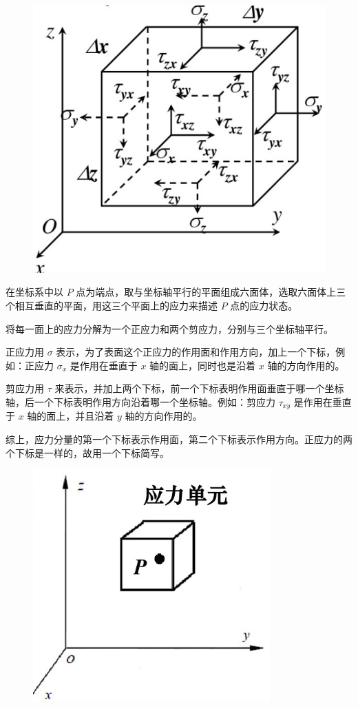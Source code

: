 \documentclass[12pt,a4paper]{article}
\begin{document}
\begin{figure}[H]
\centering
\includegraphics[scale=0.5]{./figures/17.png}
\caption{}
\end{figure}

在坐标系中以 $P$ 点为端点，取与坐标轴平行的平面组成六面体，选取六面体上三个相互垂直的平面，用这三个平面上的应力来描述 $P$ 点的应力状态。

将每一面上的应力分解为一个正应力和两个剪应力，分别与三个坐标轴平行。

正应力用 $\sigma$ 表示，为了表面这个正应力的作用面和作用方向，加上一个下标，例如：正应力 $\sigma_x$ 是作用在垂直于 $x$ 轴的面上，同时也是沿着 $x$ 轴的方向作用的。

剪应力用 $\tau$ 来表示，并加上两个下标，前一个下标表明作用面垂直于哪一个坐标轴，后一个下标表明作用方向沿着哪一个坐标轴。例如：剪应力 $\tau_{xy}$ 是作用在垂直于 $x$ 轴的面上，并且沿着 $y$ 轴的方向作用的。

综上，应力分量的第一个下标表示作用面，第二个下标表示作用方向。正应力的两个下标是一样的，故用一个下标简写。

\begin{figure}[H]
\centering
\includegraphics[scale=0.4]{./figures/3.png}
\caption{}
\end{figure}
\end{document}
